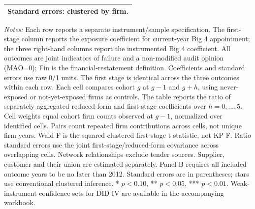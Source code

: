 \documentclass[10pt]{article}
\begin{document}
\begin{minipage}{23.60cm}
\begin{tabular*}{\linewidth}{@{\extracolsep{\fill}}lccccccc@{}}
\multicolumn{8}{l}{Standard errors: clustered by firm.} \\
\bottomrule\end{tabular*}\par\medskip
\fontsize{9}{11}\selectfont\textit{Notes:} Each row reports a separate instrument/sample specification. The first-stage column reports the exposure coefficient for current-year Big 4 appointment; the three right-hand columns report the instrumented Big 4 coefficient. All outcomes are joint indicators of failure and a non-modified audit opinion (MAO=0); Fin is the financial-restatement definition. Coefficients and standard errors use raw 0/1 units. The first stage is identical across the three outcomes within each row.
Each cell compares cohort $g$ at $g-1$ and $g+h$, using never-exposed or not-yet-exposed firms as controls. The table reports the ratio of separately aggregated reduced-form and first-stage coefficients over $h=0,\ldots,5$. Cell weights equal cohort firm counts observed at $g-1$, normalized over identified cells. Pairs count repeated firm contributions across cells, not unique firm-years. Wald F is the squared clustered first-stage t statistic, not KP F. Ratio standard errors use the joint first-stage/reduced-form covariance across overlapping cells.
Network relationships exclude tender sources. Supplier, customer and their union are estimated separately.
Panel B requires all included outcome years to be no later than 2012. Standard errors are in parentheses; stars use conventional clustered inference. * $p<0.10$, ** $p<0.05$, *** $p<0.01$. Weak-instrument confidence sets for DID-IV are available in the accompanying workbook.
\end{minipage}
\end{document}
